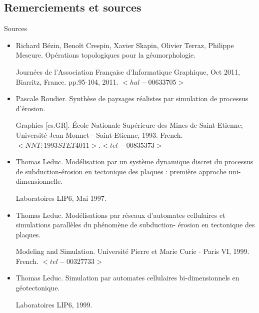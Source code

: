 \documentclass{beamer}
\begin{document}
\subsection{Remerciements et sources}
\begin{frame}{Sources}
  \begin{footnotesize}
  \begin{itemize}
   \item Richard Bézin, Benoît Crespin, Xavier Skapin, Olivier Terraz, Philippe Meseure. Opérations
topologiques pour la géomorphologie.
    \begin{tiny} 
     Journées de l’Association Française d’Informatique Graphique, Oct 2011, Biarritz, France. pp.95-104, 2011. $<hal-00633705>$
    \end{tiny}
   \item Pascale Roudier. Synthèse de paysages réalistes par simulation de processus d’érosion. 
    \begin{tiny}
    Graphics
[cs.GR]. École Nationale Supérieure des Mines de Saint-Etienne; Université Jean Monnet -
Saint-Etienne, 1993. French. $<NNT : 1993STET4011>. <tel-00835373>$
	\end{tiny}
   \item Thomas Leduc. Modélisation par un système dynamique discret du processus de subduction-érosion en tectonique des plaques : première approche uni-dimensionnelle. 
    \begin{tiny}
    Laboratoires LIP6, Mai 1997.
    \end{tiny}
   \item Thomas Leduc. Modélisations par réseaux d’automates cellulaires et simulations parallèles
du phénomène de subduction- érosion en tectonique des plaques. 
     \begin{tiny}
     Modeling and Simulation.
Université Pierre et Marie Curie - Paris VI, 1999. French. $<tel-00327733>$
	 \end{tiny}
   \item Thomas Leduc. Simulation par automates cellulaires bi-dimensionnels en géotectonique. 
     \begin{tiny}
     Laboratoires LIP6, 1999.
     \end{tiny}
  \end{itemize}
  \end{footnotesize}
\end{frame}
\end{document}

